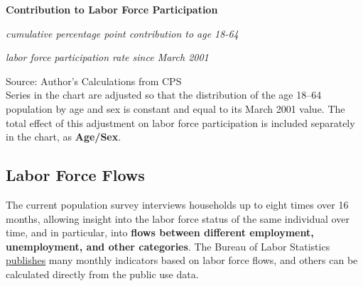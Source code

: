 \documentclass{report}
\makeatletter
\newcommand{\tbllink}[1]{\href{https://raw.githubusercontent.com/bdecon/US-chartbook/master/chartbook/data/#1}{\faTable}}
\newcommand*\short[1]{\expandafter\@gobbletwo\number\numexpr#1\relax}
\newcommand{\stdnode}[3]{\node[below, align=left, shift=({#1,#2})]{#3};}
\newcommand{\dateaxisticks}{
		date coordinates in=x, axis line style={draw=none},
		xmax={2020-08-10},
		max space between ticks=40,	    
		xtick={{1990-01-01}, {1992-01-01}, {1994-01-01}, 
			{1996-01-01}, {1998-01-01}, {2000-01-01}, 
			{2002-01-01}, {2004-01-01}, {2006-01-01},
			{2008-01-01}, {2010-01-01}, {2012-01-01}, {2014-01-01},
		    {2016-01-01}, {2018-01-01}, {2020-01-01}},
		minor xtick={{1989-01-01}, {1991-01-01}, {1993-01-01},
			{1995-01-01}, {1997-01-01}, {1999-01-01}, 
			{2001-01-01}, {2003-01-01}, {2005-01-01}, {2007-01-01},
		    {2009-01-01}, {2011-01-01}, {2013-01-01}, {2015-01-01},
		    {2017-01-01}, {2019-01-01}},
		enlarge y limits={0.06}, enlarge x limits={0.01},
		}
\newcommand{\bbar}[2]{extra #1 ticks = {{#2}}, extra #1 tick labels = ,
		extra #1 tick style = {grid=major, grid style={thick, black!25}},}
\newcommand{\stdline}[4]{\addplot[very thick, no markers, color=#1] 
		table [x=#2, y=#3, col sep=comma] {#4};	}
\newcommand{\thickline}[4]{\addplot[ultra thick, no markers, color=#1] 
		table [x=#2, y=#3, col sep=comma] {#4};	}
\newcommand{\rebars}{
		\fill[color=black!10] (axis cs:{2007-12-01},\pgfkeysvalueof{/pgfplots/ymin}) rectangle 
			(axis cs:{2009-07-01}, \pgfkeysvalueof{/pgfplots/ymax});
		\fill[color=black!10] (axis cs:{2001-03-01},\pgfkeysvalueof{/pgfplots/ymin}) rectangle 
			(axis cs:{2001-11-01}, \pgfkeysvalueof{/pgfplots/ymax});
		\fill[color=black!10] (axis cs:{2020-02-01},\pgfkeysvalueof{/pgfplots/ymin}) rectangle 
			(axis cs:{2020-09-01}, \pgfkeysvalueof{/pgfplots/ymax});}
\makeatother
\begin{document}
{{{{{{{{{\begin{minipage}{0.3\textwidth}
\small  
\end{minipage} \hspace{7mm}
\begin{minipage}{0.42\textwidth}
\normalsize \textbf{Contribution to Labor Force Participation}

\footnotesize{\textit{cumulative percentage point contribution to age 18-64}}

\footnotesize{\textit{labor force participation rate since March 2001}}

\hspace*{-3mm} 

\footnotesize{Source: Author's Calculations from CPS} \hfill \tbllink{nilf.csv}\\

\footnotesize Series in the chart are adjusted so that the distribution of the age 18--64 population by age and sex is constant and equal to its March 2001 value. The total effect of this adjustment on labor force participation is included separately in the chart, as \color{violet!80!purple}\textbf{Age/Sex}.
\end{minipage}

\newpage
\begin{minipage}{0.76\textwidth}
\subsection*{\color{black!70} \seriffont Labor Force Flows}
\small The current population survey interviews households up to eight times over 16 months, allowing insight into the labor force status of the same individual over time, and in particular, into \textbf{flows between different employment, unemployment, and other categories}. The Bureau of Labor Statistics \href{https://www.bls.gov/cps/cps_flows.htm}{publishes} many monthly indicators based on labor force flows, and others can be calculated directly from the public use data.\\


\end{minipage}}}}}}}}}}
\end{document}
